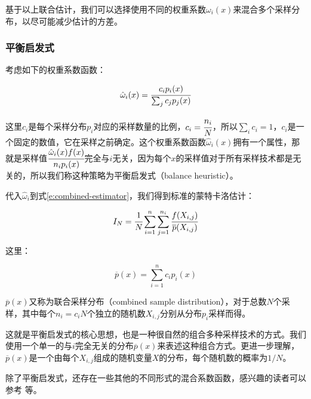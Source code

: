 基于以上联合估计，我们可以选择使用不同的权重系数$\omega_i(x)$来混合多个采样分布，以尽可能减少估计的方差。




\subsubsection{平衡启发式}\label{sec:mc-balance-heuristic}
考虑如下的权重系数函数：

\begin{equation}
	\hat{\omega}_i(x)= \cfrac{c_ip_i(x)}{\sum_j c_jp_j(x)}
\end{equation}

\noindent 这里$c_i$是每个采样分布$p_i$对应的采样数量的比例，$c_i= \cfrac{n_i}{N}$，所以$\sum_i c_i=1$，$c_i$是一个固定的数值，它在采样之前确定。这个权重系数函数$\hat{\omega}_i(x)$拥有一个属性，那就是采样值$ \cfrac{\hat{\omega}_i(x)f(x)}{n_ip_i(x)}$完全与$i$无关，因为每个$x$的采样值对于所有采样技术都是无关的，所以我们称这种策略为平衡启发式（balance heuristic）。

代入$\hat{\omega}_i$到式\ref{e:combined-estimator}，我们得到标准的蒙特卡洛估计：

\begin{equation}
	I_N= \cfrac{1}{N}\sum_{i=1}^{n}\sum_{j=1}^{n_i} \cfrac{f(X_{i,j})}{\overline{p}(X_{i,j})}
\end{equation} 

\noindent 这里：

\begin{equation}
	\overline{p}(x)=\sum_{i=1}^{n}c_ip_i(x)
\end{equation}

$\overline{p}(x)$又称为联合采样分布（combined sample distribution），对于总数$N$个采样，其中每个$n_i=c_i N$个独立的随机数$X_{i,j}$分别从分布$p_i$采样而得。

这就是平衡启发式的核心思想，也是一种很自然的组合多种采样技术的方式。我们使用一个单一的与$i$完全无关的分布$\overline{p}(x)$来表述这种组合方式。更进一步理解，$\overline{p}(x)$是一个由每个$X_{i,j}$组成的随机变量$X$的分布，每个随机数的概率为$1/N$。

除了平衡启发式，还存在一些其他的不同形式的混合系数函数，感兴趣的读者可以参考 \cite{a:Safeandeffectiveimportancesampling,a:AdaptiveMultipleImportanceSampling,a:ANADAPTIVEPOPULATIONIMPORTANCESAMPLER,a:EfficientMultipleImportanceSamplingEstimators}等。





